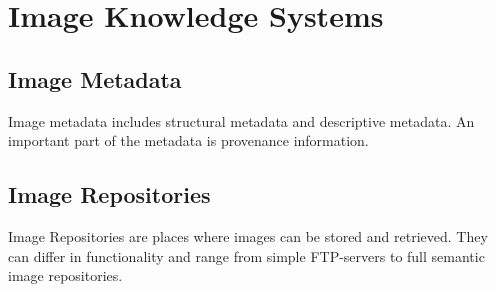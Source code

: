 
\chapter{Image Knowledge Systems} %

\label{Chapter2} %



\section{Image Metadata}

Image metadata includes structural
metadata and descriptive
metadata. An important part of the
metadata is provenance information.


\section{Image Repositories}

Image Repositories are places where images
can be stored and retrieved. They can differ in functionality and
range from simple FTP-servers to full
semantic image repositories.
